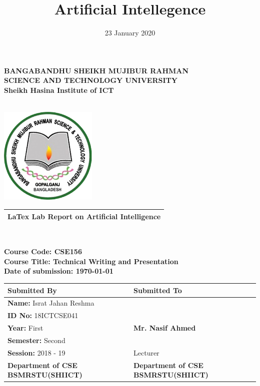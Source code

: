 \documentclass[12pt]{article}
\title{Artificial Intellegence}
\date{23 January 2020}
\begin{document}
\begin{titlepage}
     \begin{center}
     
     \begin{large}
     
     \textbf{BANGABANDHU SHEIKH MUJIBUR RAHMAN}\\ \textbf{SCIENCE AND TECHNOLOGY UNIVERSITY}\\
     \textbf{Sheikh Hasina Institute of ICT}
     
     \end{large}
     
     \\[1in]
     \includegraphics[width=0.35\textwidth]{Image/logo.png}
     \\[0.5in]
     
     \begin{LARGE}
     \begin{tabular}{| c |}
     \hline
     \textbf{LaTex Lab Report on Artificial Intelligence}\\
     \hline
     \end{tabular}
     \end{LARGE}
     
     \\[0.5in]
    
     \begin{flushleft}
     \textbf{ Course Code: CSE156\\}
     \textbf{ Course Title: Technical Writing and Presentation\\}
     \textbf{ Date of submission: \today\\}
     \end{flushleft}
     
     \renewcommand{\tabcolsep}{1pt}
     \begin{tabular}{ | p{7cm} | p{7cm}|} 
     \hline \textbf{Submitted By} & \textbf{Submitted To}\\ 
     \hline
     \textbf{Name: }  Israt Jahan Reshma & \\
     \textbf{ID No: }18ICTCSE041  &     \\
     \textbf{Year: }  First        &   \textbf{Mr. Nasif Ahmed}\\
     \textbf{Semester: }  Second     &    \\
     \textbf{Session: }  2018 - 19  &     Lecturer\\
     \textbf{Department of CSE BSMRSTU(SHIICT)} & \textbf{Department  of CSE BSMRSTU(SHIICT)}\\
     \hline
    \end{tabular}
    
     \end{center} 
\end{titlepage}
\end{document}

